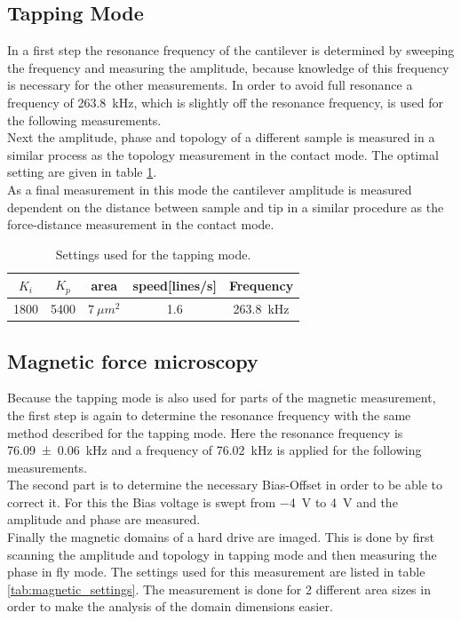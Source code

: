 \documentclass[%
 reprint,
amsmath,amssymb,
pra,
]{revtex4-1}
\begin{document}
\subsection{Tapping Mode}
In a first step the resonance frequency of the cantilever is determined by sweeping the frequency and measuring the amplitude, because knowledge of this frequency is necessary for the other measurements. In order to avoid full resonance a frequency of \SI{263.8}{kHz}, which is slightly off the resonance frequency, is used for the following measurements.\\
Next the amplitude, phase and topology of a different sample is measured in a similar process as the topology measurement in the contact mode. The optimal setting are given in table \ref{tab:tapping_settings}.\\
As a final measurement in this mode the cantilever amplitude is measured dependent on the distance between sample and tip in a similar procedure as the force-distance measurement in the contact mode. 
\begin{table}[h]
\centering
\begin{tabular}{|c|c|c|c|c|}
\hline 
$K_i$ & $K_p$ & area & speed[lines/s] & Frequency\\ 
\hline 
1800 & 5400 & $\SI{7}{\mu m^2}$ & 1.6 & \SI{263.8}{kHz}\\ 
\hline 
\end{tabular} 
\caption{Settings used for the tapping mode.}
\label{tab:tapping_settings}
\end{table}

\subsection{Magnetic force microscopy}
Because the tapping mode is also used for parts of the magnetic measurement, the first step is again to determine the resonance frequency with the same method described for the tapping mode. Here the resonance frequency is \SI{76.09 \pm 0.06}{kHz} and a frequency of \SI{76.02}{kHz} is applied for the following measurements.\\
The second part is to determine the necessary Bias-Offset in order to be able to correct it. For this the Bias voltage is swept from \SI{-4}{V} to \SI{4}{V} and the amplitude and phase are measured.\\
Finally the magnetic domains of a hard drive are imaged. This is done by first scanning the amplitude and topology in tapping mode and then measuring the phase in fly mode. The settings used for this measurement are listed in table \ref{tab:magnetic_settings}. The measurement is done for 2 different area sizes in order to make the analysis of the domain dimensions easier.
\end{document}
